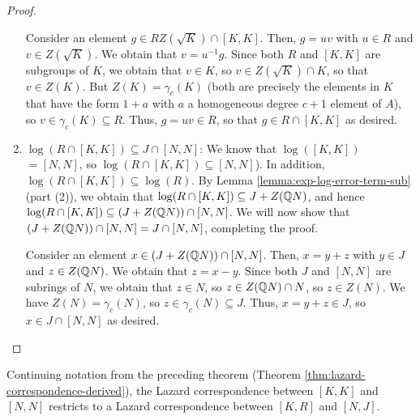 \begin{proof}
\begin{enumerate}
    Consider an element $g \in RZ(\sqrt{K}) \cap [K,K]$. Then, $g =
    uv$ with $u \in R$ and $v \in Z(\sqrt{K})$. We obtain that $v =
    u^{-1}g$. Since both $R$ and $[K,K]$ are subgroups of $K$, we
    obtain that $v \in K$, so $v \in Z(\sqrt{K}) \cap K$, so that $v
    \in Z(K)$. But $Z(K) = \gamma_c(K)$ (both are precisely the
    elements in $K$ that have the form $1 + a$ with $a$ a homogeneous
    degree $c + 1$ element of $A$), so $v \in \gamma_c(K) \subseteq
    R$. Thus, $g = uv \in R$, so that $g \in R \cap [K,K]$ as desired.
  \item $\log(R \cap [K,K]) \subseteq J \cap [N,N]$: We know that
    $\log([K,K])$ $= [N,N]$, so $\log(R \cap [K,K]) \subseteq
    [N,N]$). In addition, $\log(R \cap [K,K]) \subseteq \log(R)$. By
    Lemma \ref{lemma:exp-log-error-term-sub} (part (2)), we obtain
    that $\log(R \cap [K,K]) \subseteq J + Z(\mathbb{Q} N)$, and hence $\log(R
    \cap [K,K]) \subseteq (J + Z(\mathbb{Q} N)) \cap [N,N]$. We will now show
    that $(J + Z(\mathbb{Q} N)) \cap [N,N] = J \cap [N,N]$, completing the
    proof.

    Consider an element $x \in (J + Z(\mathbb{Q} N)) \cap [N,N]$. Then, $x= y
    + z$ with $y \in J$ and $z \in Z(\mathbb{Q} N)$. We obtain that $z = x -
    y$. Since both $J$ and $[N,N]$ are subrings of $N$, we obtain that
    $z \in N$, so $z \in Z(\mathbb{Q} N) \cap N$, so $z \in Z(N)$. We have
    $Z(N) = \gamma_c(N)$, so $z \in \gamma_c(N) \subseteq J$. Thus, $x
    = y + z \in J$, so $x \in J \cap [N,N]$ as desired.
  \end{enumerate}
\end{proof}

\begin{theorem}\label{thm:lazard-correspondence-commutator-lie}
  Continuing notation from the preceding theorem (Theorem
  \ref{thm:lazard-correspondence-derived}), the Lazard correspondence
  between $[K,K]$ and $[N,N]$ restricts to a Lazard correspondence
  between $[K,R]$ and $[N,J]$.
\end{theorem}

